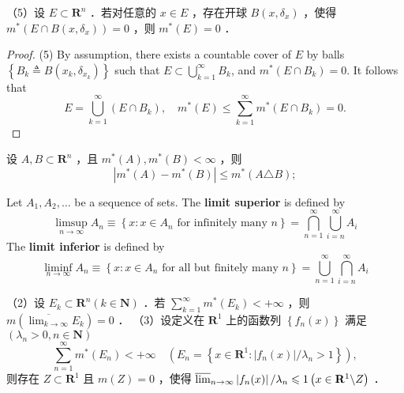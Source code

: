 \begin{exercise}
（5）设 $E \subset \mathbf{R}^n$ ．若对任意的 $x \in E$ ，存在开球 $B\left(x, \delta_x\right)$ ，使得 $m^*\left(E \cap B\left(x, \delta_x\right)\right)=0$ ，则 $m^*(E)=0$ ．
\end{exercise}
\begin{proof}
(5) By assumption, there exists a countable cover of $E$ by balls $\left\{B_k \triangleq B\left(x_k, \delta_{x_k}\right)\right\}$ such that $E \subset \bigcup_{k=1}^{\infty} B_k$, and $m^*\left(E \cap B_k\right)=0$. It follows that
\[
E=\bigcup_{k=1}^{\infty}\left(E \cap B_k\right), \quad m^*(E) \leqslant \sum_{k=1}^{\infty} m^*\left(E \cap B_k\right)=0 .
\]
\end{proof}

\begin{proposition}
设 $A, B \subset \mathbf{R}^n$ ，且 $m^*(A), m^*(B)<\infty$ ，则
\[
\left|m^*(A)-m^*(B)\right| \leqslant m^*(A \triangle B) ;
\]
\end{proposition}
\begin{definition}
Let $A_1, A_2, \dots$ be a sequence of sets. The \textbf{limit superior} is defined by
\[
\limsup _{n \rightarrow \infty} A_n \equiv\left\{x: x \in A_n \text { for infinitely many } n\right\}=\bigcap_{n=1}^{\infty} \bigcup_{i=n}^{\infty} A_i
\]The \textbf{limit inferior} is defined by
\[
\liminf _{n \rightarrow \infty} A_n \equiv\left\{x: x \in A_n \text { for all but finitely many } n\right\}=\bigcup_{n=1}^{\infty} \bigcap_{i=n}^{\infty} A_i
\]
\end{definition}
\begin{exercise}
（2）设 $E_k \subset \mathbf{R}^n(k \in \mathbf{N})$ ．若 $\sum_{k=1}^{\infty} m^*\left(E_k\right)<+\infty$ ，则 $m\left(\overline{\lim _{k \rightarrow \infty}} E_k\right)=0$ ．
（3）设定义在 $\mathbf{R}^1$ 上的函数列 $\left\{f_n(x)\right\}$ 满足 $\left(\lambda_n>0, n \in \mathbf{N}\right)$
\[
\sum_{n=1}^{\infty} m^*\left(E_n\right)<+\infty \quad\left(E_n=\left\{x \in \mathbf{R}^1:\left|f_n(x)\right| / \lambda_n>1\right\}\right),
\]则存在 $Z \subset \mathbf{R}^1$ 且 $m(Z)=0$ ，使得 $\varlimsup_{n \rightarrow \infty}\left|f_n(x)\right| / \lambda_n \leqslant 1\left(x \in \mathbf{R}^1 \backslash Z\right)$ ．
\end{exercise}
